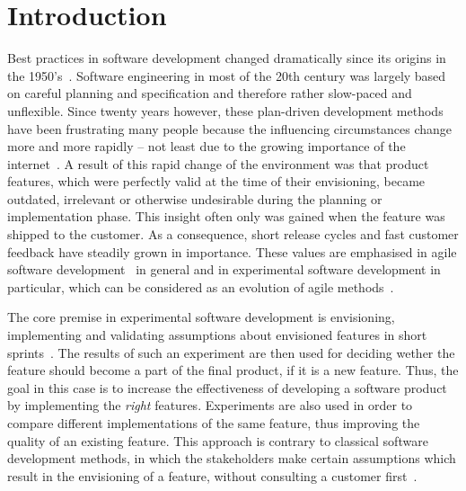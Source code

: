 %
\chapter{Introduction}
\label{sec:intro}


Best practices in software development changed dramatically since its origins in the 1950's~\cite{boehm2006view}.
Software engineering in most of the 20th century was largely based on careful planning and specification and therefore rather slow-paced and unflexible.
Since twenty years however, these plan-driven development methods have been frustrating many people because the influencing circumstances change more and more rapidly -- not least due to the growing importance of the internet~\cite{Williams2003}.
A result of this rapid change of the environment was that product features, which were perfectly valid at the time of their envisioning, became outdated, irrelevant or otherwise undesirable during the planning or implementation phase.
This insight often only was gained when the feature was shipped to the customer.
As a consequence, short release cycles and fast customer feedback have steadily grown in importance.
These values are emphasised in agile software development~\cite{fowler2001agile} in general and in experimental software development in particular, which can be considered as an evolution of agile methods~\cite{Bosch2012}.

The core premise in experimental software development is envisioning, implementing and validating assumptions about envisioned features in short sprints~\cite{Bosch2012}.
The results of such an experiment are then used for deciding wether the feature should become a part of the final product, if it is a new feature.
Thus, the goal in this case is to increase the effectiveness of developing a software product by implementing the \emph{right} features.
Experiments are also used in order to compare different implementations of the same feature, thus improving the quality of an existing feature.
This approach is contrary to classical software development methods, in which the stakeholders make certain assumptions which result in the envisioning of a feature, without consulting a customer first~\cite{Bosch2012}.

